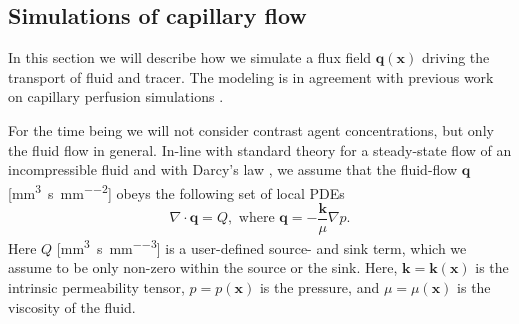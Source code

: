 \documentclass[journal,twocolumn]{IEEEtran}
\newcommand{\vq}{\mathbf{q}}
\newcommand{\vx}{\mathbf{x}}
\newcommand{\siQmm}{\milli\meter\cubed\per\second\per\milli\meter\cubed}
\newcommand{\siq}{\milli\meter\cubed\per\second\per\milli\meter\squared}
\newcommand{\siQtilde}{\milli\gram\per\second\per\milli\meter\cubed}
\begin{document}
	

	\subsection{Simulations of capillary flow}\label{sec:flow}
	In this section we will describe how we simulate a flux field $\vq(\vx)$ driving the transport of fluid and tracer.
	The modeling is in agreement with previous work on capillary perfusion simulations \cite{Cho2011,Cookson2012,Michler2013}. 

	For the time being we will not consider contrast agent concentrations, but only the fluid flow in general.
	In-line with standard theory for a steady-state flow of an incompressible fluid and with Darcy's law \cite{Darcy56}, we assume that the fluid-flow $\vq$ [\si{\siq}] obeys the following set of local PDEs
	\begin{equation}
		\nabla \cdot \vq = Q, \text{ where }\vq = -\frac{\mathbf{k}}{\mu} \nabla p.
		\label{eq:syntcontsimp}
	\end{equation}	
	Here $Q$ [\si{\siQmm}] is a user-defined source- and sink term, which we assume to be only non-zero within the source or the sink.
	Here, $\mathbf{k} = \mathbf{k}(\vx)$ is the intrinsic permeability tensor, $p=p(\vx)$ is the pressure, and $\mu = \mu(\vx)$ is the viscosity of the fluid. 	
\end{document}
